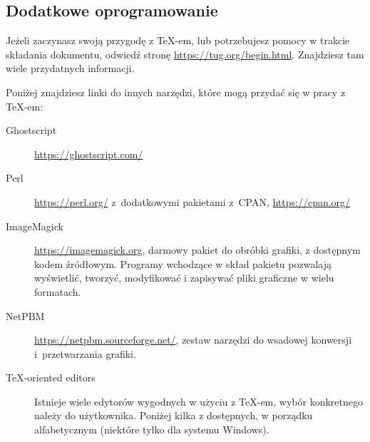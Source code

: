 \documentclass{article}
\begin{document}
\subsection{Dodatkowe oprogramowanie}
Jeżeli zaczynasz swoją przygodę z \TeX-em, lub potrzebujesz pomocy w trakcie składania dokumentu, odwiedź stronę \url{https://tug.org/begin.html}. Znajdziesz tam wiele przydatnych informacji.

Poniżej znajdziesz linki do innych narzędzi, które mogą przydać się  w pracy z \TeX-em:
\begin{description}
\item[Ghostscript] \url{https://ghostscript.com/}
\item[Perl] \url{https://perl.org/} z~dodatkowymi pakietami z~CPAN, \url{https://cpan.org/}
\item[ImageMagick] \url{https://imagemagick.org}, darmowy pakiet do obróbki grafiki, z dostępnym kodem źródłowym. Programy wchodzące w skład pakietu pozwalają wyświetlić, tworzyć, modyfikować i zapisywać pliki graficzne w wielu formatach.
\item[NetPBM] \url{https://netpbm.sourceforge.net/}, zestaw narzędzi do wsadowej konwersji i~przetwarzania grafiki.

\item[\TeX-oriented editors] Istnieje wiele  edytorów wygodnych w użyciu z \TeX-em,  wybór konkretnego należy do  użytkownika. Poniżej kilka z dostępnych, w porządku alfabetycznym (niektóre tylko dla systemu Windows).
\end{description}
\end{document}
